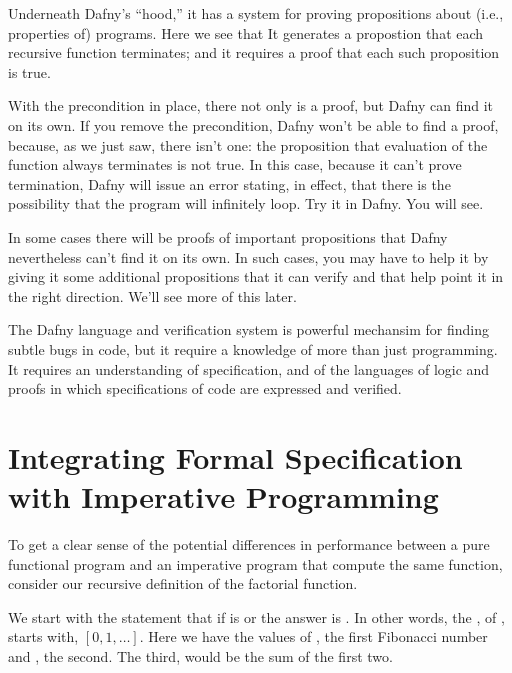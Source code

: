 \documentclass[letterpaper,10pt,english]{sphinxmanual}
\begin{document}
Underneath Dafny’s “hood,” it has a system for proving propositions
about (i.e., properties of) programs. Here we see that It generates a
propostion that each recursive function terminates; and it requires a
proof that each such proposition is true.

With the precondition in place, there not only is a proof, but Dafny
can find it on its own. If you remove the precondition, Dafny won’t be
able to find a proof, because, as we just saw, there isn’t one: the
proposition that evaluation of the function always terminates is not
true. In this case, because it can’t prove termination, Dafny will
issue an error stating, in effect, that there is the possibility that
the program will infinitely loop. Try it in Dafny.  You will see.

In some cases there will be proofs of important propositions that
Dafny nevertheless can’t find it on its own. In such cases, you may
have to help it by giving it some additional propositions that it
can verify and that help point it in the right direction. We’ll see
more of this later.

The Dafny language and verification system is powerful mechansim for
finding subtle bugs in code, but it require a knowledge of more than
just programming. It requires an understanding of specification, and
of the languages of logic and proofs in which specifications of code
are expressed and verified.


\chapter{Integrating Formal Specification with Imperative Programming}
\label{\detokenize{05-putting-it-together:integrating-formal-specification-with-imperative-programming}}\label{\detokenize{05-putting-it-together::doc}}
To get a clear sense of the potential differences in performance
between a pure functional program and an imperative program that
compute the same function, consider our recursive definition of the
factorial function.

We start with the statement that if  is  or  the answer is
.  In other words, the ,  of , starts with, \([0, 1, \ldots ]\). Here we have the
values of , the first Fibonacci number and , the
second. The third,  would be the sum of the first two.
\end{document}
